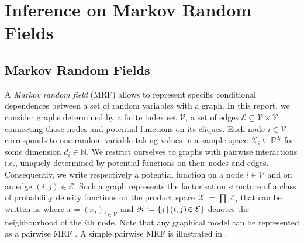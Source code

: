 

\section{Inference on Markov Random Fields}


\subsection{\label{subsection: mrf}Markov Random Fields}


%
A \emph{Markov random field} (MRF) allows to represent specific conditional dependences between a set of random variables with a graph. 
In this report, we consider graphs determined by a finite index set $\mathcal V$, a set of edges $\mathcal E\subseteq \mathcal V\times \mathcal V$ connecting those nodes and potential functions on its cliques. Each node $i\in\mathcal V$ corresponds to one random variable taking values in a sample space $\mathcal X_i \subseteq\mathbb R^{d_i}$ for some dimension $d_i\in\mathbb N$. We restrict ourselves to graphs with pairwise interactions i.e., uniquely determined by potential functions on their nodes and edges. 
Consequently, we write
%
% 
respectively a potential function on a node $i\in \mathcal V$ and on an edge $(i,j)\in \mathcal E$. 
Such a graph represents the factorisation structure of a class of probability density functions on the product space $\mathcal X := \prod\mathcal X_{i}$ that can be written as
where $x=(x_{i})_{i\in \mathcal V}$ and $\partial i:=\{j\,|\, (i,j)\!\in\,\!\mathcal E\}$ denotes the neighbourhood of the $i$th node. Note that any graphical model can be represented as a pairwise MRF \citep{yedidia00}. 
A simple pairwise MRF is illustrated in .\\

